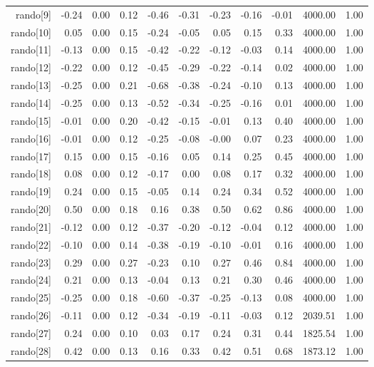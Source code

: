 \begin{table}[ht]
\begin{tabular}{rrrrrrrrrrr}
  rando[9] & -0.24 & 0.00 & 0.12 & -0.46 & -0.31 & -0.23 & -0.16 & -0.01 & 4000.00 & 1.00 \\ 
  rando[10] & 0.05 & 0.00 & 0.15 & -0.24 & -0.05 & 0.05 & 0.15 & 0.33 & 4000.00 & 1.00 \\ 
  rando[11] & -0.13 & 0.00 & 0.15 & -0.42 & -0.22 & -0.12 & -0.03 & 0.14 & 4000.00 & 1.00 \\ 
  rando[12] & -0.22 & 0.00 & 0.12 & -0.45 & -0.29 & -0.22 & -0.14 & 0.02 & 4000.00 & 1.00 \\ 
  rando[13] & -0.25 & 0.00 & 0.21 & -0.68 & -0.38 & -0.24 & -0.10 & 0.13 & 4000.00 & 1.00 \\ 
  rando[14] & -0.25 & 0.00 & 0.13 & -0.52 & -0.34 & -0.25 & -0.16 & 0.01 & 4000.00 & 1.00 \\ 
  rando[15] & -0.01 & 0.00 & 0.20 & -0.42 & -0.15 & -0.01 & 0.13 & 0.40 & 4000.00 & 1.00 \\ 
  rando[16] & -0.01 & 0.00 & 0.12 & -0.25 & -0.08 & -0.00 & 0.07 & 0.23 & 4000.00 & 1.00 \\ 
  rando[17] & 0.15 & 0.00 & 0.15 & -0.16 & 0.05 & 0.14 & 0.25 & 0.45 & 4000.00 & 1.00 \\ 
  rando[18] & 0.08 & 0.00 & 0.12 & -0.17 & 0.00 & 0.08 & 0.17 & 0.32 & 4000.00 & 1.00 \\ 
  rando[19] & 0.24 & 0.00 & 0.15 & -0.05 & 0.14 & 0.24 & 0.34 & 0.52 & 4000.00 & 1.00 \\ 
  rando[20] & 0.50 & 0.00 & 0.18 & 0.16 & 0.38 & 0.50 & 0.62 & 0.86 & 4000.00 & 1.00 \\ 
  rando[21] & -0.12 & 0.00 & 0.12 & -0.37 & -0.20 & -0.12 & -0.04 & 0.12 & 4000.00 & 1.00 \\ 
  rando[22] & -0.10 & 0.00 & 0.14 & -0.38 & -0.19 & -0.10 & -0.01 & 0.16 & 4000.00 & 1.00 \\ 
  rando[23] & 0.29 & 0.00 & 0.27 & -0.23 & 0.10 & 0.27 & 0.46 & 0.84 & 4000.00 & 1.00 \\ 
  rando[24] & 0.21 & 0.00 & 0.13 & -0.04 & 0.13 & 0.21 & 0.30 & 0.46 & 4000.00 & 1.00 \\ 
  rando[25] & -0.25 & 0.00 & 0.18 & -0.60 & -0.37 & -0.25 & -0.13 & 0.08 & 4000.00 & 1.00 \\ 
  rando[26] & -0.11 & 0.00 & 0.12 & -0.34 & -0.19 & -0.11 & -0.03 & 0.12 & 2039.51 & 1.00 \\ 
  rando[27] & 0.24 & 0.00 & 0.10 & 0.03 & 0.17 & 0.24 & 0.31 & 0.44 & 1825.54 & 1.00 \\ 
  rando[28] & 0.42 & 0.00 & 0.13 & 0.16 & 0.33 & 0.42 & 0.51 & 0.68 & 1873.12 & 1.00 \\ 

\end{tabular}
\end{table}

